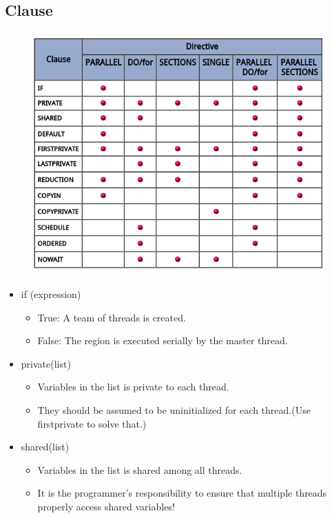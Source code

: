 \documentclass{beamer}
\begin{document}
	\subsection{Clause}
	\begin{frame}
		\frametitle{\insertsubsection}
		\begin{figure}[H]
			\centering
			\includegraphics[width=0.8\linewidth]{clause.png}
		\end{figure}
	\end{frame}
	\begin{frame}
		\frametitle{\insertsubsection}
		\begin{itemize}
			\item if (expression)\begin{itemize}
				\item True: A team of threads is created.
				\item False: The region is executed serially by the master thread.
			\end{itemize}
			\item private(list) \begin{itemize}
				\item Variables in the list is private to each thread.
				\item They should be assumed to be uninitialized for each thread.(Use firstprivate to solve that.)
			\end{itemize}
			\item shared(list) \begin{itemize}
				\item Variables in the list is shared among all threads.
				\item It is the programmer's responsibility to ensure that multiple threads properly access shared variables!
			\end{itemize}
		\end{itemize}
	\end{frame}
\end{document}

